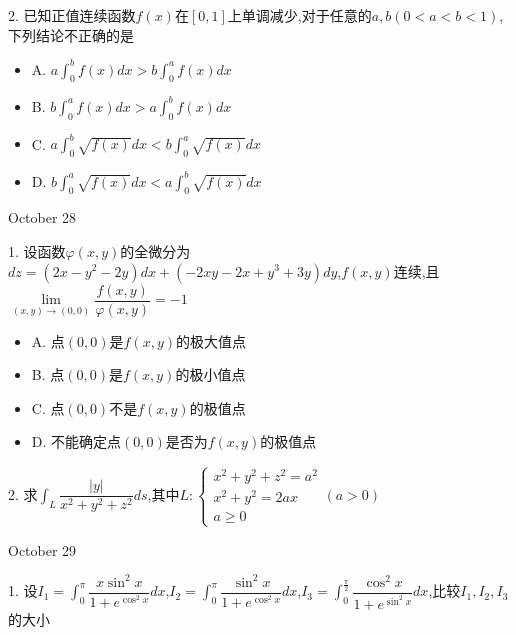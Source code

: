 \begin{solution}
	
\end{solution}


2. 已知正值连续函数$f(x)$在$[0,1]$上单调减少,对于任意的$a,b(0<a<b<1)$,下列结论不正确的是
\begin{itemize}
	\item A. $a\int_{0}^{b}f(x)dx>b\int_{0}^{a}f(x)dx$
	\item B. $b\int_{0}^{a}f(x)dx>a\int_{0}^{b}f(x)dx$
	\item C. $a\int_{0}^{b}\sqrt{f(x)}dx<b\int_{0}^{a}\sqrt{f(x)}dx$
	\item D. $b\int_{0}^{a}\sqrt{f(x)}dx<a\int_{0}^{b}\sqrt{f(x)}dx$
\end{itemize}

\begin{solution}
	
\end{solution}


\textcolor{purplea}{October 28}

1. 设函数$\varphi(x,y)$的全微分为$dz=(2x-y^2-2y)dx+(-2xy-2x+y^3+3y)dy$,$f(x,y)$连续,且$\lim\limits_{(x,y)\to (0,0)}\dfrac{f(x,y)}{\varphi(x,y)}=-1$
\begin{itemize}
	\item A. 点$(0,0)$是$f(x,y)$的极大值点
	\item B. 点$(0,0)$是$f(x,y)$的极小值点
	\item C. 点$(0,0)$不是$f(x,y)$的极值点
	\item D. 不能确定点$(0,0)$是否为$f(x,y)$的极值点
\end{itemize}

\begin{solution}
	
\end{solution}


2. 求$\int_{L}\dfrac{|y|}{x^2+y^2+z^2}ds$,其中$L:\left\lbrace 
\begin{array}{l}
	x^2+y^2+z^2=a^2\\
	x^2+y^2=2ax\\
	a\geq 0
\end{array}
\right. (a>0)$


\begin{solution}
	
\end{solution}


\textcolor{purplea}{October 29}

1. 设$I_{1}=\int_{0}^{\pi}\dfrac{x\sin^2 x}{1+e^{\cos^2 x}}dx$,$I_{2}=\int_{0}^{\pi}\dfrac{\sin^2 x}{1+e^{\cos^2 x}}dx$,$I_{3}=\int_{0}^{\frac{\pi}{2}}\dfrac{\cos^2 x}{1+e^{\sin^2 x}}dx$,比较$I_{1},I_{2},I_{3}$的大小


